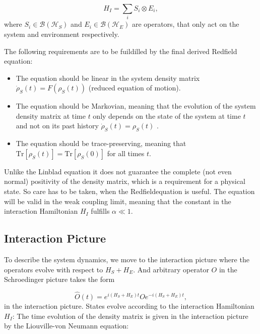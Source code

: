 \begin{equation}
	H_I = \sum_i S_i \otimes E_i,
	\label{eq:Interaction_Hamiltonian}
\end{equation}
where $S_i \in \mathcal{B}(\mathcal{H}_S)$ and $E_i \in \mathcal{B}(\mathcal{H}_E)$ are operators, that only act on the system and environment respectively.

The following requirements are to be fuildilled by the final derived Redfield equation:

\begin{itemize}
	\item The equation should be linear in the system density matrix $ \dot{ \rho}_S(t) = F(\rho_S(t))$ (reduced equation of motion).
	\item The equation should be Markovian, meaning that the evolution of the system density matrix at time $t$ only depends on the state of the system at time $t$ and not on its past history $ \dot{ \rho}_S(t) = \rho_S(t)$ .
	\item The equation should be trace-preserving, meaning that $\mathrm{Tr}[\rho_S(t)] = \mathrm{Tr}[\rho_S(0)]$ for all times $t$.
\end{itemize}
Unlike the Linblad equation it does not guarantee the complete (not even normal) positivity of the density matrix, which is a requirement for a physical state.
So care has to be taken, when the Redfieldequation is useful.
The equation will be valid in the weak coupling limit, meaning that the constant in the interaction Hamiltonian $H_I$ fulfills  $\alpha \ll  1$.


\subsection{Interaction Picture}
\label{subsec:Interaction_Picture}

To describe the system dynamics, we move to the interaction picture where the operators evolve with respect to $H_S + H_E$.
And arbitrary operator $O$ in the Schroedinger picture takes the form

\begin{equation}
	\hat{O}(t) = e^{i(H_S+H_E)t} O e^{-i(H_S+H_E)t},
	\label{eq:Interaction_Picture_Operators}
\end{equation}
in the interaction picture. States evolve according to the interaction Hamiltonian $H_I$:
The time evolution of the density matrix is given in the interaction picture by the Liouville-von Neumann equation:

